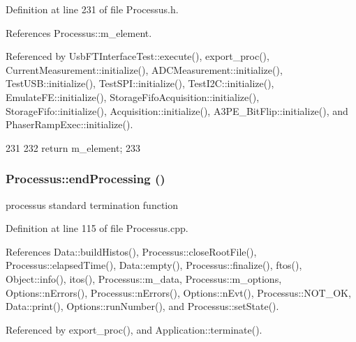 Definition at line 231 of file Processus.h.

References Processus::m\_\-element.

Referenced by UsbFTInterfaceTest::execute(), export\_\-proc(), CurrentMeasurement::initialize(), ADCMeasurement::initialize(), TestUSB::initialize(), TestSPI::initialize(), TestI2C::initialize(), EmulateFE::initialize(), StorageFifoAcquisition::initialize(), StorageFifo::initialize(), Acquisition::initialize(), A3PE\_\-BitFlip::initialize(), and PhaserRampExec::initialize().


\begin{DoxyCode}
231                       {
232     return m_element;
233   }
\end{DoxyCode}
\hypertarget{classProcessus_a5e4da662989d356b89d490b89c7afbfd}{
\subsubsection[{endProcessing}]{ Processus::endProcessing ()}}
\label{classProcessus_a5e4da662989d356b89d490b89c7afbfd}
processus standard termination function 

Definition at line 115 of file Processus.cpp.

References Data::buildHistos(), Processus::closeRootFile(), Processus::elapsedTime(), Data::empty(), Processus::finalize(), ftos(), Object::info(), itos(), Processus::m\_\-data, Processus::m\_\-options, Options::nErrors(), Processus::nErrors(), Options::nEvt(), Processus::NOT\_\-OK, Data::print(), Options::runNumber(), and Processus::setState().

Referenced by export\_\-proc(), and Application::terminate().



